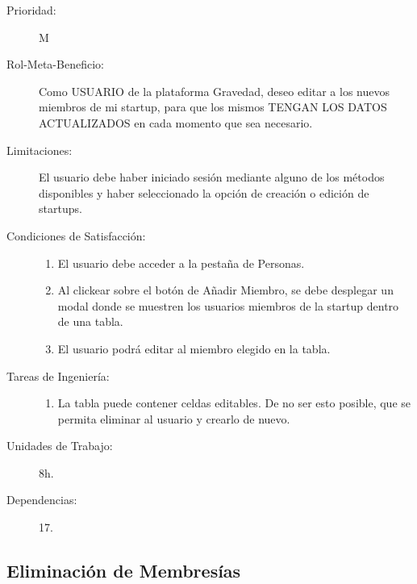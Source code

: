 \begin{description}
    \item[Prioridad:] M
    \item[Rol-Meta-Beneficio:]  Como USUARIO de la plataforma Gravedad, deseo editar a los nuevos miembros de mi startup, para que los mismos TENGAN LOS DATOS ACTUALIZADOS en cada momento que sea necesario.
    \item[Limitaciones:]  El usuario debe haber iniciado sesión mediante alguno de los métodos disponibles y haber seleccionado la opción de creación o edición de startups.
    \item[Condiciones de Satisfacción:]  \hfill
        \begin{enumerate}
            \item El usuario debe acceder a la pestaña de Personas.
    		\item Al clickear sobre el botón de Añadir Miembro, se debe desplegar un modal donde se muestren los usuarios miembros de la startup dentro de una tabla.
    		\item El usuario podrá editar al miembro elegido en la tabla.
        \end{enumerate}
    \item[Tareas de Ingeniería:]  \hfill
        \begin{enumerate}
            \item La tabla puede contener celdas editables. De no ser esto posible, que se permita eliminar al usuario y crearlo de nuevo.
        \end{enumerate}
    \item[Unidades de Trabajo:] 8h.
    \item[Dependencias:] 17.
\end{description}

\newpage


\subsection{Eliminación de Membresías}

